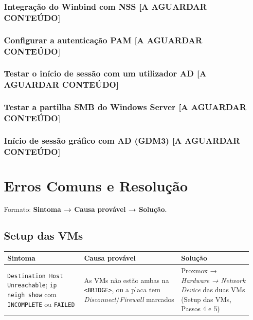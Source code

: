 \documentclass[11pt,a4paper,oneside]{report}
\newcommand{\aguardar}{{\normalfont\small\color{cinza}[A AGUARDAR CONTEÚDO]}}
\begin{document}
\subsection[Integração do Winbind com NSS]{Integração do Winbind com NSS \aguardar}

\subsection[Configurar a autenticação PAM]{Configurar a autenticação PAM \aguardar}

\subsection[Testar o início de sessão com um utilizador AD]{Testar o início de sessão com um utilizador AD \aguardar}

\subsection[Testar a partilha SMB do Windows Server]{Testar a partilha SMB do Windows Server \aguardar}

\subsection[Início de sessão gráfico com AD (GDM3)]{Início de sessão gráfico com AD (GDM3) \aguardar}

\chapter*{Erros Comuns e Resolução}

Formato: \textbf{Sintoma → Causa provável → Solução}.

\label{ec-setup}

\section*{Setup das VMs}

\begin{center}\small
\begin{tabularx}{\linewidth}{|>{\raggedright\arraybackslash}X|>{\raggedright\arraybackslash}X|>{\raggedright\arraybackslash}X|}
\hline
\rowcolor{azul!10}\textbf{Sintoma} & \textbf{Causa provável} & \textbf{Solução} \\
\hline
\texttt{Destination Host Unreachable}; \texttt{ip neigh show} com \texttt{INCOMPLETE} ou \texttt{FAILED} & As VMs não estão ambas na \texttt{\textless{}BRIDGE\textgreater{}}, ou a placa tem \emph{Disconnect}/\emph{Firewall} marcados & Proxmox → \emph{Hardware → Network Device} das duas VMs (Setup das VMs, Passos 4 e 5) \\
\hline
\end{tabularx}
\end{center}
\end{document}
